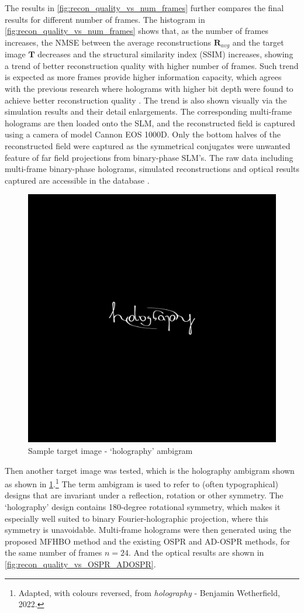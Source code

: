	The results in \cref{fig:recon_quality_vs_num_frames} further compares the final results for different number of frames. The histogram in \cref{fig:recon_quality_vs_num_frames} shows that, as the number of frames increases, the NMSE between the average reconstructions $\textbf{R}_{avg}$ and the target image $\textbf{T}$ decreases and the structural similarity index (SSIM)\cite{Wang2004_SSIM} increases, showing a trend of better reconstruction quality with higher number of frames. Such trend is expected as more frames provide higher information capacity, which agrees with the previous research where holograms with higher bit depth were found to achieve better reconstruction quality \cite{Sha2024}. The trend is also shown visually via the simulation results and their detail enlargements. The corresponding multi-frame holograms are then loaded onto the SLM, and the reconstructed field is captured using a camera of model Cannon EOS 1000D. Only the bottom halves of the reconstructed field were captured as the symmetrical conjugates were unwanted feature of far field projections from binary-phase SLM's. The raw data including multi-frame binary-phase holograms, simulated reconstructions and optical results captured are accessible in the database \cite{research_data_MFHO2024}.

	\begin{figure}[H]
		\centering
		\includegraphics[width=0.5\linewidth]{holography_ambigram_smaller.png}
		\caption{Sample target image - `holography' ambigram}
		\label{fig:holography_ambigram_smaller}
	\end{figure}

	Then another target image was tested, which is the holography ambigram shown  as shown in \cref{fig:holography_ambigram_smaller}.\footnote{Adapted, with colours reversed, from  \emph{holography} - Benjamin Wetherfield, 2022.} The term ambigram is used to refer to (often typographical) designs that are invariant under a reflection, rotation or other symmetry. The `holography' design contains 180-degree rotational symmetry, which makes it especially well suited to binary Fourier-holographic projection, where this symmetry is unavoidable. Multi-frame holograms were then generated using the proposed MFHBO method and the existing OSPR and AD-OSPR methods, for the same number of frames $n=24$. And the optical results are shown in \cref{fig:recon_quality_vs_OSPR_ADOSPR}.

